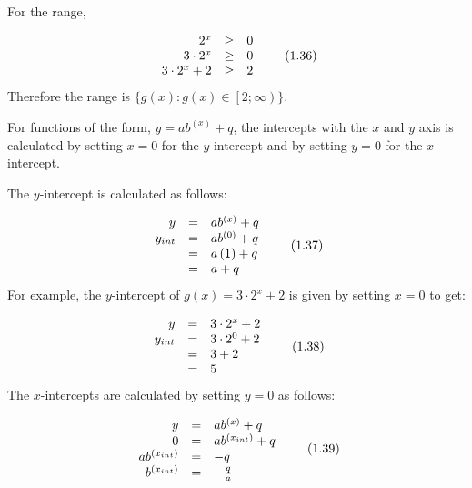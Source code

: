 For the range,\par 
\label{m39348*id251239}\nopagebreak\noindent{}
\begin{equation}
\begin{array}{ccc}\hfill {2}^{x}& \ge & 0\hfill \\ \hfill 3\ensuremath{\cdot}{2}^{x}& \ge & 0\hfill \\ \hfill 3\ensuremath{\cdot}{2}^{x}+2& \ge & 2\hfill \end{array}\tag{1.36}
\end{equation}
\label{m39348*id251329}Therefore the range is $\{g\left(x\right):g\left(x\right)\in \left[2;\infty \right)\}$.\par 
\label{m39348*uid188}
\nopagebreak
\label{m39348*id251389}For functions of the form, $y=a{b}^{\left(x\right)}+q$, the intercepts with the $x$ and $y$ axis is calculated by setting $x=0$ for the $y$-intercept and by setting $y=0$ for the $x$-intercept.\par 
\label{m39348*id251491}The $y$-intercept is calculated as follows:\par 
\label{m39348*uid189}\nopagebreak\noindent{}
\begin{equation}
\begin{array}{ccc}\hfill y& =& a{b}^{\left(x\right)}+q\hfill \\ \hfill {y}_{int}& =& a{b}^{\left(0\right)}+q\hfill \\ & =& a\left(1\right)+q\hfill \\ & =& a+q\hfill \end{array}\tag{1.37}
\end{equation}
\label{m39348*id251637}For example, the $y$-intercept of $g\left(x\right)=3\ensuremath{\cdot}{2}^{x}+2$ is given by setting $x=0$ to get:\par 
\label{m39348*id251703}\nopagebreak\noindent{}
\begin{equation}
\begin{array}{ccc}\hfill y& =& 3\ensuremath{\cdot}{2}^{x}+2\hfill \\ \hfill {y}_{int}& =& 3\ensuremath{\cdot}{2}^{0}+2\hfill \\ & =& 3+2\hfill \\ & =& 5\hfill \end{array}\tag{1.38}
\end{equation}
\label{m39348*id251812}The $x$-intercepts are calculated by setting $y=0$ as follows:\par 
\label{m39348*uid190}\nopagebreak\noindent{}
\begin{equation}
\begin{array}{ccc}\hfill y& =& a{b}^{\left(x\right)}+q\hfill \\ \hfill 0& =& a{b}^{\left({x}_{int}\right)}+q\hfill \\ \hfill a{b}^{\left({x}_{int}\right)}& =& -q\hfill \\ \hfill {b}^{\left({x}_{int}\right)}& =& -\frac{q}{a}\hfill \end{array}\tag{1.39}
\end{equation}

